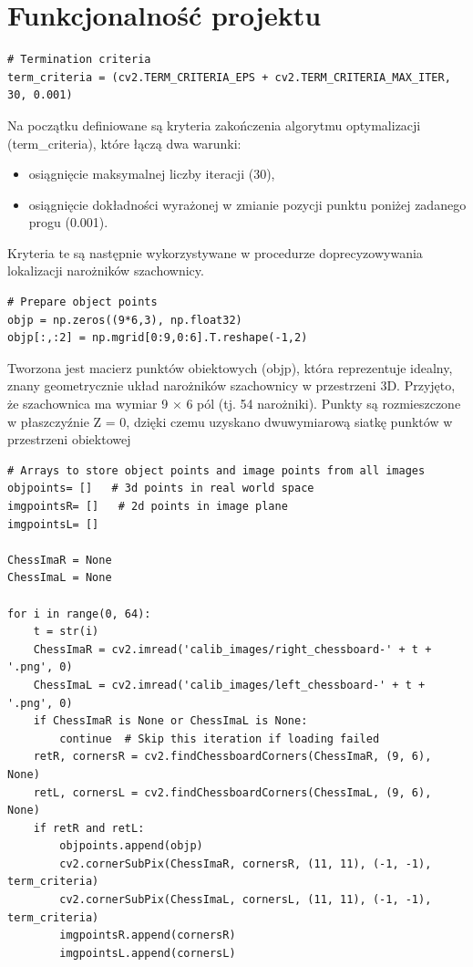 \documentclass[magisterska]{pracadypl}
\begin{document}
\chapter{Funkcjonalność projektu}

\begin{lstlisting}[style=mypython]
# Termination criteria
term_criteria = (cv2.TERM_CRITERIA_EPS + cv2.TERM_CRITERIA_MAX_ITER, 30, 0.001)
\end{lstlisting}

Na początku definiowane są kryteria zakończenia algorytmu optymalizacji (term\_criteria), które łączą dwa warunki:

\begin{itemize}
    \item osiągnięcie maksymalnej liczby iteracji (30),
    \item osiągnięcie dokładności wyrażonej w zmianie pozycji punktu poniżej zadanego progu (0.001).
\end{itemize}

Kryteria te są następnie wykorzystywane w procedurze doprecyzowywania lokalizacji narożników szachownicy.

\begin{lstlisting}[style=mypython]
# Prepare object points
objp = np.zeros((9*6,3), np.float32)
objp[:,:2] = np.mgrid[0:9,0:6].T.reshape(-1,2)
\end{lstlisting}

Tworzona jest macierz punktów obiektowych (objp), która reprezentuje idealny, znany geometrycznie układ narożników szachownicy w przestrzeni 3D. Przyjęto, że szachownica ma wymiar 9 × 6 pól (tj. 54 narożniki). Punkty są rozmieszczone w płaszczyźnie Z = 0, dzięki czemu uzyskano dwuwymiarową siatkę punktów w przestrzeni obiektowej

\begin{lstlisting}[style=mypython]
# Arrays to store object points and image points from all images
objpoints= []   # 3d points in real world space
imgpointsR= []   # 2d points in image plane
imgpointsL= []

ChessImaR = None
ChessImaL = None

for i in range(0, 64):
    t = str(i)
    ChessImaR = cv2.imread('calib_images/right_chessboard-' + t + '.png', 0)
    ChessImaL = cv2.imread('calib_images/left_chessboard-' + t + '.png', 0)
    if ChessImaR is None or ChessImaL is None:
        continue  # Skip this iteration if loading failed
    retR, cornersR = cv2.findChessboardCorners(ChessImaR, (9, 6), None)
    retL, cornersL = cv2.findChessboardCorners(ChessImaL, (9, 6), None)
    if retR and retL:
        objpoints.append(objp)
        cv2.cornerSubPix(ChessImaR, cornersR, (11, 11), (-1, -1), term_criteria)
        cv2.cornerSubPix(ChessImaL, cornersL, (11, 11), (-1, -1), term_criteria)
        imgpointsR.append(cornersR)
        imgpointsL.append(cornersL)
\end{lstlisting}
\end{document}

